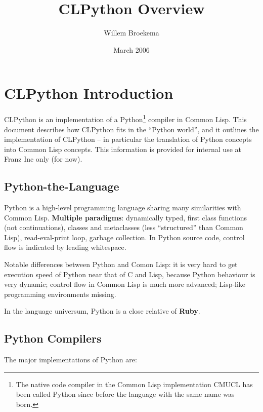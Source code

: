 \documentclass{article}
\begin{document}
\title{CLPython Overview}
\author{Willem Broekema}
\date{March 2006}
\maketitle

\tableofcontents{}

\section{CLPython Introduction}
CLPython is an implementation of a Python\footnote{The native code
compiler in the Common Lisp implementation CMUCL has been called
Python since before the language with the same name was born.}
compiler in Common Lisp. This document describes how CLPython fits in
the ``Python world'', and it outlines the implementation of CLPython
-- in particular the translation of Python concepts into Common Lisp
concepts. This information is provided for internal use at
Franz Inc only (for now).

\subsection{Python-the-Language}
Python is a high-level programming language sharing many similarities
with Common Lisp. {\bf Multiple paradigms}: dynamically typed, first
class functions (not continuations), classes and metaclasses (less
``structured'' than Common Lisp), read-eval-print loop, garbage
collection. In Python source code, control flow is indicated by
leading whitespace.

Notable differences between Python and Comon Lisp: it is very hard to
get execution speed of Python near that of C and Lisp, because Python
behaviour is very dynamic; control flow in Common Lisp is much more
advanced; Lisp-like programming environments missing.

In the language universum, Python is a close relative of {\bf Ruby}.

\subsection{Python Compilers}
The major implementations of Python are:
\end{document}
